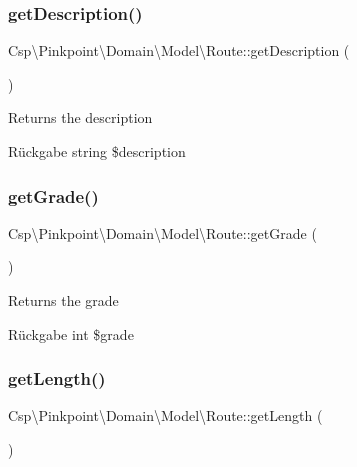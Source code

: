 \subsubsection{\texorpdfstring{get\+Description()}{getDescription()}}
{\footnotesize\ttfamily Csp\textbackslash{}\+Pinkpoint\textbackslash{}\+Domain\textbackslash{}\+Model\textbackslash{}\+Route\+::get\+Description (\begin{DoxyParamCaption}{ }\end{DoxyParamCaption})}

Returns the description

\begin{DoxyReturn}{Rückgabe}
string \$description 
\end{DoxyReturn}
\mbox{\label{classCsp_1_1Pinkpoint_1_1Domain_1_1Model_1_1Route_a9d54c15f15183b99ecbe60914768bca6}} 
\subsubsection{\texorpdfstring{get\+Grade()}{getGrade()}}
{\footnotesize\ttfamily Csp\textbackslash{}\+Pinkpoint\textbackslash{}\+Domain\textbackslash{}\+Model\textbackslash{}\+Route\+::get\+Grade (\begin{DoxyParamCaption}{ }\end{DoxyParamCaption})}

Returns the grade

\begin{DoxyReturn}{Rückgabe}
int \$grade 
\end{DoxyReturn}
\mbox{\label{classCsp_1_1Pinkpoint_1_1Domain_1_1Model_1_1Route_a4984510eedb5ecf897c1fdf3c5a42048}} 
\subsubsection{\texorpdfstring{get\+Length()}{getLength()}}
{\footnotesize\ttfamily Csp\textbackslash{}\+Pinkpoint\textbackslash{}\+Domain\textbackslash{}\+Model\textbackslash{}\+Route\+::get\+Length (\begin{DoxyParamCaption}{ }\end{DoxyParamCaption})}

